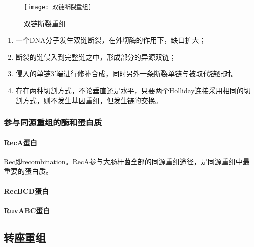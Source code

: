 \begin{figure}[htbp]
	\centering
	\texttt{[image: 双链断裂重组]}
	\caption{双链断裂重组}
	\label{fig:双链断裂重组}
\end{figure}

\begin{enumerate}
	\item 一个DNA分子发生双链断裂，在外切酶的作用下，缺口扩大；
	\item 断裂的链侵入到完整链之中，形成部分的异源双链；
	\item 侵入的单链3$\prime$端进行修补合成，同时另外一条断裂单链与被取代链配对。
	\item 存在两种切割方式，不论垂直还是水平，只要两个Holliday连接采用相同的切割方式，则不发生基因重组，但发生链的交换。
\end{enumerate}

\subsubsection{参与同源重组的酶和蛋白质}

\paragraph{RecA蛋白}

Rec即recombination。RecA参与大肠杆菌全部的同源重组途径，是同源重组中最重要的蛋白质。

\paragraph{RecBCD蛋白}

\paragraph{RuvABC蛋白}
\subsection{转座重组}

